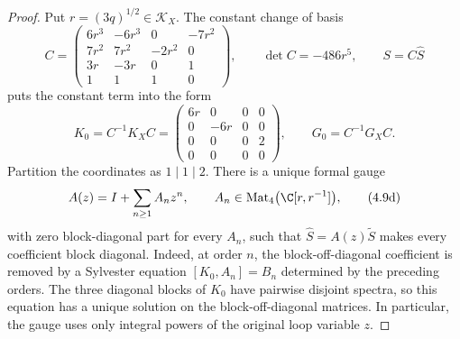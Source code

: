 \begin{proof}
Put \(r=(3q)^{1/2}\in\mathcal K_X\).  The constant change of basis
\[
 C=\begin{pmatrix}
 6r^3&-6r^3&0&-7r^2\\
 7r^2&7r^2&-2r^2&0\\
 3r&-3r&0&1\\
 1&1&1&0
 \end{pmatrix},
 \qquad \det C=-486r^5,
 \qquad S=C\widehat S
 \tag{4.9b}
 \label{eq:cubic-constant-block-basis}
\]
puts the constant term into the form
\[
 K_0=C^{-1}K_XC=
 \begin{pmatrix}
 6r&0&0&0\\
 0&-6r&0&0\\
 0&0&0&2\\
 0&0&0&0
 \end{pmatrix},
 \qquad G_0=C^{-1}G_XC.
 \tag{4.9c}
 \label{eq:cubic-constant-block-form}
\]
Partition the coordinates as \(1\mathbin{|}1\mathbin{|}2\).  There is a
unique formal gauge
\[
 A(z)=I+\sum_{n\ge1}A_nz^n,
 \qquad A_n\in\operatorname{Mat}_4\bigl(\C[r,r^{-1}]\bigr),
 \tag{4.9d}
 \label{eq:cubic-integral-block-gauge}
\]
with zero block-diagonal part for every \(A_n\), such that
\(\widehat S=A(z)\widetilde S\) makes every coefficient block diagonal.
Indeed, at order \(n\), the block-off-diagonal coefficient is removed by a
Sylvester equation \([K_0,A_n]=B_n\) determined by the preceding orders.
The three diagonal blocks of \(K_0\) have pairwise disjoint spectra, so this
equation has a unique solution on the block-off-diagonal matrices.  In
particular, the gauge uses only integral powers of the original loop variable
\(z\).


\end{proof}
